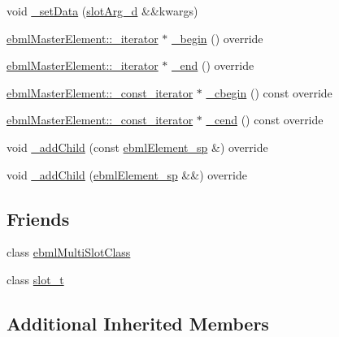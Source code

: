 \begin{DoxyCompactItemize}
\item 
void \mbox{\hyperlink{classebml_1_1ebmlMultiSlot_a3de8d499755f77822a4b135f37741bb9}{\+\_\+set\+Data}} (\mbox{\hyperlink{namespaceebml_a4317d4c495715eced3ed448c2d05caeb}{slot\+Arg\+\_\+d}} \&\&kwargs)
\item 
\mbox{\hyperlink{classebml_1_1ebmlMasterElement_1_1__iterator}{ebml\+Master\+Element\+::\+\_\+iterator}} $\ast$ \mbox{\hyperlink{classebml_1_1ebmlMultiSlot_a61a2bb09ccbf771a9023774e0cdcbad2}{\+\_\+begin}} () override
\item 
\mbox{\hyperlink{classebml_1_1ebmlMasterElement_1_1__iterator}{ebml\+Master\+Element\+::\+\_\+iterator}} $\ast$ \mbox{\hyperlink{classebml_1_1ebmlMultiSlot_a8374290bfe21447729ed0331eb845905}{\+\_\+end}} () override
\item 
\mbox{\hyperlink{classebml_1_1ebmlMasterElement_1_1__const__iterator}{ebml\+Master\+Element\+::\+\_\+const\+\_\+iterator}} $\ast$ \mbox{\hyperlink{classebml_1_1ebmlMultiSlot_adf1816c367909a1d265f38419febf9c7}{\+\_\+cbegin}} () const override
\item 
\mbox{\hyperlink{classebml_1_1ebmlMasterElement_1_1__const__iterator}{ebml\+Master\+Element\+::\+\_\+const\+\_\+iterator}} $\ast$ \mbox{\hyperlink{classebml_1_1ebmlMultiSlot_a6bc62e4030734829022930e89e94278e}{\+\_\+cend}} () const override
\item 
void \mbox{\hyperlink{classebml_1_1ebmlMultiSlot_ad5f24ddcacb5a5fcc78a8cc50166d092}{\+\_\+add\+Child}} (const \mbox{\hyperlink{namespaceebml_adad533b7705a16bb360fe56380c5e7be}{ebml\+Element\+\_\+sp}} \&) override
\item 
void \mbox{\hyperlink{classebml_1_1ebmlMultiSlot_aa8d38591ef1932423e2f62d42cc4967c}{\+\_\+add\+Child}} (\mbox{\hyperlink{namespaceebml_adad533b7705a16bb360fe56380c5e7be}{ebml\+Element\+\_\+sp}} \&\&) override
\end{DoxyCompactItemize}
\subsection*{Friends}
\begin{DoxyCompactItemize}
\item 
class \mbox{\hyperlink{classebml_1_1ebmlMultiSlot_a229e8a019ffa3d8ab84c711635badcd1}{ebml\+Multi\+Slot\+Class}}
\item 
class \mbox{\hyperlink{classebml_1_1ebmlMultiSlot_a6546cbde3dc2846c329fd0ea73da851b}{slot\+\_\+t}}
\end{DoxyCompactItemize}
\subsection*{Additional Inherited Members}


